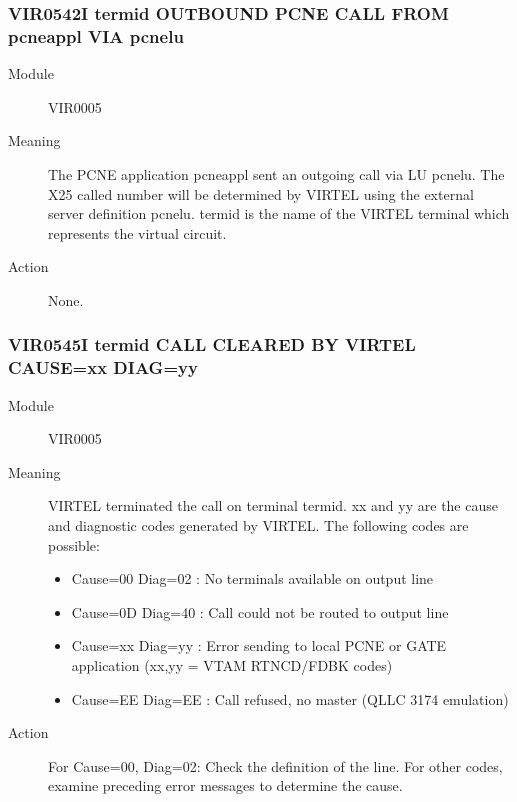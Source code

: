 \documentclass[letterpaper,10pt,english]{sphinxmanual}
\begin{document}
\subsubsection{VIR0542I termid OUTBOUND PCNE CALL FROM pcneappl VIA pcnelu}
\label{\detokenize{messages:vir0542i-termid-outbound-pcne-call-from-pcneappl-via-pcnelu}}\begin{description}
\item[{Module}] \leavevmode
VIR0005

\item[{Meaning}] \leavevmode
The PCNE application pcneappl sent an outgoing call via LU pcnelu. The X25 called number will be determined by VIRTEL using the external server definition pcnelu. termid is the name of the VIRTEL terminal which represents the virtual circuit.

\item[{Action}] \leavevmode
None.

\end{description}


\subsubsection{VIR0545I termid CALL CLEARED BY VIRTEL CAUSE=xx DIAG=yy}
\label{\detokenize{messages:vir0545i-termid-call-cleared-by-virtel-cause-xx-diag-yy}}\begin{description}
\item[{Module}] \leavevmode
VIR0005

\item[{Meaning}] \leavevmode
VIRTEL terminated the call on terminal termid. xx and yy are the cause and diagnostic codes generated by VIRTEL. The following codes are possible:
\begin{itemize}
\item {} 
Cause=00 Diag=02 : No terminals available on output line

\item {} 
Cause=0D Diag=40 : Call could not be routed to output line

\item {} 
Cause=xx Diag=yy : Error sending to local PCNE or GATE application (xx,yy = VTAM RTNCD/FDBK codes)

\item {} 
Cause=EE Diag=EE : Call refused, no master (QLLC 3174 emulation)

\end{itemize}

\item[{Action}] \leavevmode
For Cause=00, Diag=02: Check the definition of the line. For other codes, examine preceding error messages to determine the cause.

\end{description}
\end{document}
